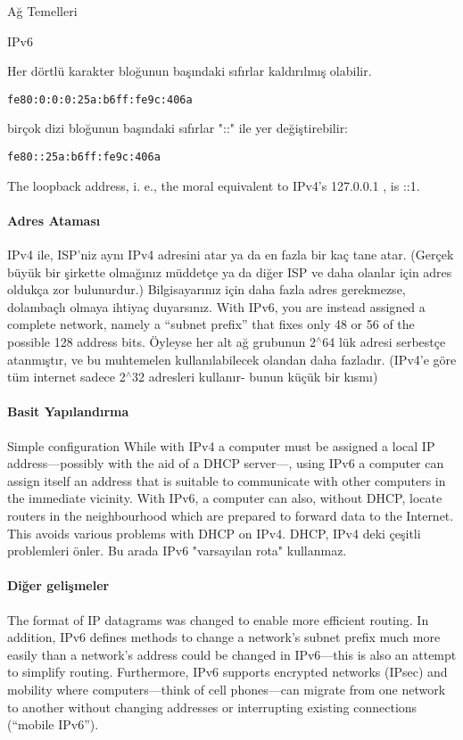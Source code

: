 \begin{section}{Ağ Temelleri}
\begin{subsection}{IPv6}
{Her dörtlü karakter bloğunun başındaki sıfırlar kaldırılmış olabilir.
\begin{verbatim}
fe80:0:0:0:25a:b6ff:fe9c:406a
\end{verbatim}
birçok dizi bloğunun başındaki sıfırlar "::" ile yer değiştirebilir:
\begin{verbatim}
fe80::25a:b6ff:fe9c:406a
\end{verbatim}

The loopback address, i. e., the moral equivalent to IPv4’s 127.0.0.1 , is ::1.
}
\paragraph{Adres Ataması}{IPv4 ile, ISP'niz aynı IPv4 adresini atar ya da en fazla bir kaç tane atar. (Gerçek büyük bir şirkette olmağınız müddetçe ya da diğer ISP ve daha olanlar için adres oldukça zor bulunurdur.) Bilgisayarınız için daha fazla adres gerekmezse, dolambaçlı olmaya ihtiyaç duyarsınız. With IPv6, you are instead assigned a complete network, namely a “subnet prefix” that fixes only 48 or 56 of the possible 128 address bits. Öyleyse her alt ağ grubunun 2$ ^\wedge $64 lük adresi serbestçe atanmıştır, ve bu muhtemelen kullanılabilecek olandan daha fazladır. (IPv4'e göre tüm internet sadece 2$ ^\wedge $32 adresleri kullanır- bunun küçük bir kısmı)}

\paragraph{Basit Yapılandırma}{Simple configuration While with IPv4 a computer must be assigned a local IP address—possibly with the aid of a DHCP server—, using IPv6 a computer can assign itself an address that is suitable to communicate with other computers in the immediate vicinity. With IPv6, a computer can also, without DHCP, locate routers in the neighbourhood which are prepared to forward data to the Internet. This avoids various problems with DHCP on IPv4.} DHCP, IPv4 deki çeşitli problemleri önler. Bu arada IPv6 "varsayılan rota" kullanmaz.

\paragraph{Diğer gelişmeler}{The format of IP datagrams was changed to enable more efficient routing. In addition, IPv6 defines methods to change a network’s subnet prefix much more easily than a network’s address could be changed in IPv6—this is also an attempt to simplify routing. Furthermore, IPv6 supports encrypted networks (IPsec) and mobility where computers—think of cell phones—can migrate from one network to another without changing addresses or interrupting existing connections (“mobile IPv6”).}


\end{subsection}
\end{section}
